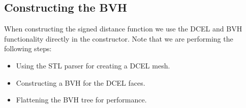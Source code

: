 \documentclass[letterpaper,10pt,english]{sphinxmanual}
\begin{document}
\begin{sphinxVerbatim}[commandchars=\\\{\}]
        
         
          

                         
         

   
   

   
\end{sphinxVerbatim}


\subsection{Constructing the BVH}
\label{\detokenize{Example_Chombo3:constructing-the-bvh}}
\sphinxAtStartPar
When constructing the signed distance function we use the DCEL and BVH functionality directly in the constructor.
Note that we are performing the following steps:
\begin{itemize}
\item {} 
\sphinxAtStartPar
Using the STL parser for creating a DCEL mesh.

\item {} 
\sphinxAtStartPar
Constructing a BVH for the DCEL faces.

\item {} 
\sphinxAtStartPar
Flattening the BVH tree for performance.

\end{itemize}
\end{document}
